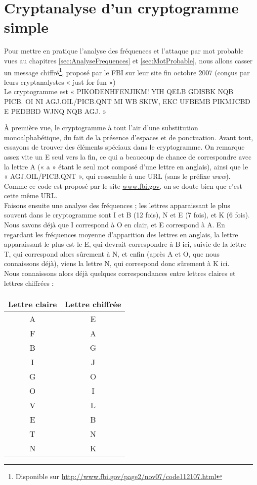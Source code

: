 
\chapter{Cryptanalyse d'un cryptogramme simple\label{Apx:FBI}}
Pour mettre en pratique l'analyse des fréquences et l'attaque par
mot probable vues au chapitres \ref{sec:AnalyseFrequences} et
\ref{sec:MotProbable}, nous allons
casser un message chiffré\footnote{Disponible sur
\url{http://www.fbi.gov/page2/nov07/code112107.html}}, 
proposé par le FBI sur leur site fin
octobre 2007 (conçus par leurs cryptanalystes « just for fun »)
\\
Le cryptogramme est « PIKODENHFENJIKM! YIH QELB GDISBK NQB
PICB. OI NI AGJ.OIL/PICB.QNT MI WB SKIW, EKC UFBEMB PIKMJCBD E
PEDBBD WJNQ NQB AGJ. »

À première vue, le cryptogramme à tout l'air d'une substitution
monoalphabétique, du fait de la présence d'espaces et de
ponctuation.
Avant tout, essayons de trouver des éléments spéciaux dans le
cryptogramme. On remarque assez vite un E seul vers la fin, ce qui
a beaucoup de chance de correspondre avec la lettre A (« a » étant
le seul mot composé d'une lettre en anglais), ainsi que le «
AGJ.OIL/PICB.QNT », qui ressemble à une URL (sans le préfixe
\emph{www}). Comme ce code est proposé par le site
\url{www.fbi.gov}, on se doute bien que c'est cette même URL.
\\

Faisons ensuite une analyse des fréquences ; les lettres
apparaissant le plus souvent dans le cryptogramme sont I et B (12
fois), N et E (7 fois), et K (6 fois).
Nous savons déjà que I correspond à O en clair, et E correspond à
A. En regardant les fréquences moyenne d'apparition des lettres en
anglais, la lettre apparaissant le plus est le E, qui devrait
correspondre à B ici, suivie de la lettre T, qui correspond alors
sûrement à N, et enfin (après A et O, que nous connaissons déjà),
viens la lettre N, qui correspond donc sûrement à K ici.
\\

Nous connaissons alors déjà quelques correspondances entre lettres
claires et lettres chiffrées : \\
\begin{center}
  \begin{tabular}{c|c}
    Lettre claire & Lettre chiffrée \\
    \hline
    A & E \\
    F & A \\
    B & G \\
    I & J \\
    G & O \\
    O & I \\
    V & L \\
    E & B \\
    T & N \\
    N & K
  \end{tabular}
\end{center}

